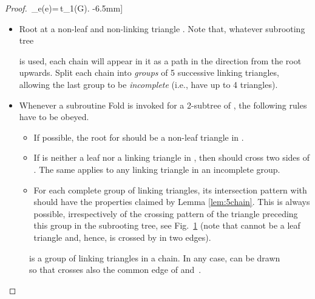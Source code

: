 \documentclass[reqno,12pt]{amsart}
\newcommand{\fold}[2]{{\sc Fold}}
\newcommand{\edit}[1]{}
\begin{document}
\begin{proof}
\,\sum_e\omega(e)=\,t_1(G).
-6.5mm]
\begin{itemize}
\item
Root  at a non-leaf and non-linking triangle .
Note that, whatever subrooting tree 
\edit{recall the notion?}
is used, each chain will appear in it
as a path in the direction from the root  upwards.
Split each chain into \emph{groups} of 5 successive linking triangles,
allowing the last group to be \emph{incomplete} (i.e., have up to 4 triangles).
\item
Whenever a subroutine \fold{}{H,xyz,XYZ} is invoked for a 2-subtree  of ,
the following rules have to be obeyed.
\begin{itemize}
\item
If possible, the root  for  should be a non-leaf triangle in .
\item
If  is neither a leaf nor a linking triangle in ,
then  should cross two sides of . The same applies to any linking
triangle in an incomplete group.
\item
For each complete group of linking triangles, its intersection pattern
with  should have the properties claimed by Lemma \ref{lem:5chain}.
This is always possible, irrespectively of the crossing pattern of the
triangle  preceding this group in the subrooting tree, see Fig.~\ref{fig:firstcross}
(note that  cannot be a leaf triangle and, hence, is crossed by 
in two edges).
\end{itemize}
\end{itemize}

\smallskip

\begin{figure}
\centering
\qquad\qquad
\caption{ is a group of linking triangles in a chain.
In any case,  can be drawn so that  crosses also the common edge of  and~.}
\label{fig:firstcross}
\end{figure}



\end{proof}
\end{document}
